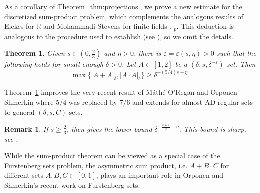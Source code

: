 \documentclass{amsart}
\newtheorem{remark}[prop]{Remark}
\newtheorem{theorem}[prop]{Theorem}
\newcommand{\R}{\mathbb{R}}
\newcommand{\F}{\mathbb{F}}
\newcommand{\eps}{\varepsilon}
\begin{document}
As a corollary of Theorem~\ref{thm:projections}, we prove  a new estimate for the discretized sum-product problem, which complements the analogous results of Elekes \cite{elekes1997number} for $\R$ and Mohammadi-Stevens \cite{mohammadi2023attaining} for finite fields $\F_p$. This deduction is analogous to the procedure used to establish \cite[Theorem 1.26]{orponen2023projections} (see \cite[Section 5.2]{orponen2023projections}), so we omit the details.

 

\begin{theorem}\label{thm:sum-product}
    Given $s \in (0, \frac{2}{3})$ and $\eta > 0$, there is $\eps = \eps(s, \eta) > 0$ such that the following holds for small enough $\delta > 0$. Let $A \subset [1, 2]$ be a $(\delta, s, \delta^{-\eps})$-set. Then
    \begin{equation*}
        \max\{ |A + A|_\delta, |A \cdot A|_\delta \} \ge \delta^{-(5/4)s + \eta}.
    \end{equation*}
\end{theorem}
Theorem~\ref{thm:sum-product} improves the very recent result of M\'{a}th\'{e}-O'Regan \cite[Theorem B]{mathe2023discretised} and Orponen-Shmerkin \cite[Theorem 1.26]{orponen2023projections} where $5/4$ was replaced by $7/6$ and extends \cite[Theorem 1.26]{orponen2023projections} for almost AD-regular sets to general $(\delta, s, C)$-sets. 

\begin{remark}
    If $s \ge \frac{2}{3}$, then \cite[Corollary 1.7]{fu2021incidence} gives the lower bound $\delta^{-\frac{s+1}{2} + \eta}$. This bound is sharp, see \cite[Remark 1.13]{mathe2023discretised}.
\end{remark}

While the sum-product theorem can be viewed as a special case of the Furstenberg sets problem, 
the asymmetric sum product, i.e. $A+B\cdot C$ for different sets $A, B, C\subset [0,1]$, plays an important role in Orponen and Shmerkin's recent work \cite{orponen2023projections} on Furstenberg sets.  

\end{document}
